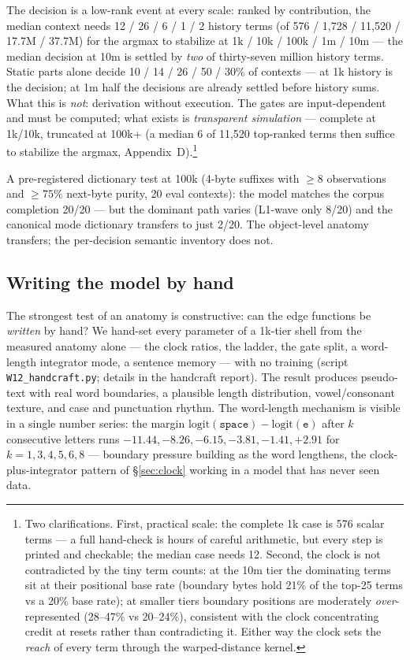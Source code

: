 \documentclass[11pt]{article}
\begin{document}
The decision is a low-rank event at every scale: ranked by contribution,
the median context needs 12 / 26 / 6 / 1 / 2 history terms (of 576 /
1{,}728 / 11{,}520 / 17.7M / 37.7M) for the argmax to stabilize at
1k / 10k / 100k / 1m / 10m --- the median decision at 10m is settled by
\emph{two} of thirty-seven million history terms. Static parts alone
decide 10 / 14 / 26 / 50 / 30\% of contexts --- at 1k history is the
decision; at 1m half the decisions are already settled before history
sums. What this is
\emph{not}: derivation without execution. The gates are input-dependent
and must be computed; what exists is \emph{transparent simulation} ---
complete at 1k/10k, truncated at 100k+ (a median 6 of 11{,}520 top-ranked
terms then suffice to stabilize the argmax, Appendix~D).\footnote{Two
clarifications. First, practical scale: the complete 1k case is 576
scalar terms --- a full hand-check is hours of careful arithmetic, but
every step is printed and checkable; the median case needs 12. Second,
the clock is not contradicted by the tiny term counts: at the 10m tier
the dominating terms sit at their positional base rate (boundary bytes
hold 21\% of the top-25 terms vs a 20\% base rate); at smaller tiers
boundary positions are moderately \emph{over}-represented (28--47\% vs
20--24\%), consistent with the clock concentrating credit at resets
rather than contradicting it. Either way the clock sets the \emph{reach}
of every term through the warped-distance kernel.}

A pre-registered dictionary test at 100k (4-byte suffixes with $\ge 8$
observations and $\ge 75\%$ next-byte purity, 20 eval contexts): the model
matches the corpus completion 20/20 --- but the dominant path varies
(L1-wave only 8/20) and the canonical mode dictionary transfers to just
2/20. The object-level anatomy transfers; the per-decision semantic
inventory does not.

\subsection{Writing the model by hand}
\label{sec:handcraft}

The strongest test of an anatomy is constructive: can the edge functions
be \emph{written} by hand? We hand-set every parameter of a 1k-tier shell
from the measured anatomy alone --- the clock ratios, the ladder, the gate
split, a word-length integrator mode, a sentence memory --- with no
training (script \texttt{W12\_handcraft.py}; details in the handcraft
report). The result produces pseudo-text with real word boundaries, a
plausible length distribution, vowel/consonant texture, and case and
punctuation rhythm. The word-length mechanism is visible in a single
number series: the margin $\text{logit}(\texttt{space}) -
\text{logit}(\texttt{e})$ after $k$ consecutive letters runs $-11.44,
-8.26, -6.15, -3.81, -1.41, +2.91$ for $k = 1, 3, 4, 5, 6, 8$ ---
boundary pressure building as the word lengthens, the clock-plus-integrator
pattern of \S\ref{sec:clock} working in a model that has never seen data.
\end{document}
